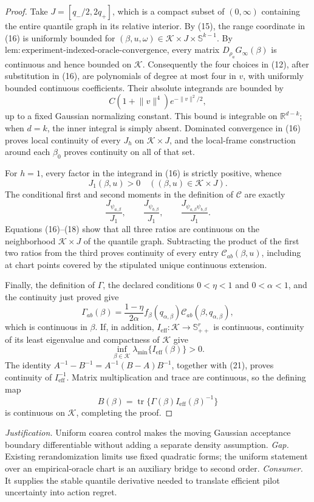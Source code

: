 \documentclass{article}
\begin{document}
\begin{proof}
Take
\(J=[q_-/2,2q_+]\), which is a compact subset of \((0,\infty)\) containing the entire quantile graph in its relative interior.  By (15), the range coordinate in (16) is uniformly bounded for \((\beta,u,\omega)\in\mathcal K\times J\times\mathbb S^{k-1}\).  By \(\mathrm{lem{:}experiment\text{-}indexed\text{-}oracle\text{-}convergence}\), every matrix \(D_{\rho_a}G_\infty(\beta)\) is continuous and hence bounded on \(\mathcal K\).  Consequently the four choices in (12), after substitution in (16), are polynomials of degree at most four in \(v\), with uniformly bounded continuous coefficients.  Their absolute integrands are bounded by
\[
C(1+\lVert v\rVert^4)e^{-\lVert v\rVert^2/2},
\tag{17}
\]
up to a fixed Gaussian normalizing constant.  This bound is integrable on \(\mathbb R^{d-k}\); when \(d=k\), the inner integral is simply absent.  Dominated convergence in (16) proves local continuity of every \(J_h\) on \(\mathcal K\times J\), and the local-frame construction around each \(\beta_0\) proves continuity on all of that set.

For \(h=1\), every factor in the integrand in (16) is strictly positive, whence
\[
J_1(\beta,u)>0
\quad((\beta,u)\in\mathcal K\times J).
\tag{18}
\]
The conditional first and second moments in the definition of \(\mathcal C\) are exactly
\[
\frac{J_{\psi_{a,\beta}}}{J_1},\qquad
\frac{J_{\psi_{b,\beta}}}{J_1},\qquad
\frac{J_{\psi_{a,\beta}\psi_{b,\beta}}}{J_1}.
\tag{19}
\]
Equations (16)--(18) show that all three ratios are continuous on the neighborhood \(\mathcal K\times J\) of the quantile graph.  Subtracting the product of the first two ratios from the third proves continuity of every entry \(\mathcal C_{ab}(\beta,u)\), including at chart points covered by the stipulated unique continuous extension.

Finally, the definition of \(\Gamma\), the declared conditions \(0<\eta<1\) and \(0<\alpha<1\), and the continuity just proved give
\[
\Gamma_{ab}(\beta)
=\frac{1-\eta}{2\alpha}
f_\beta(q_{\alpha,\beta})
\mathcal C_{ab}(\beta,q_{\alpha,\beta}),
\tag{20}
\]
which is continuous in \(\beta\).  If, in addition, \(I_{\mathrm{eff}}:\mathcal K\to\mathbb S_{++}^{r}\) is continuous, continuity of its least eigenvalue and compactness of \(\mathcal K\) give
\[
\inf_{\beta\in\mathcal K}\lambda_{\min}\{I_{\mathrm{eff}}(\beta)\}>0.
\tag{21}
\]
The identity \(A^{-1}-B^{-1}=A^{-1}(B-A)B^{-1}\), together with (21), proves continuity of \(I_{\mathrm{eff}}^{-1}\).  Matrix multiplication and trace are continuous, so the defining map
\[
B(\beta)=\operatorname{tr}\{\Gamma(\beta)I_{\mathrm{eff}}(\beta)^{-1}\}
\tag{22}
\]
is continuous on \(\mathcal K\), completing the proof.
\end{proof}
\par\smallskip\noindent \textit{Justification.} Uniform coarea control makes the moving Gaussian acceptance boundary differentiable without adding a separate density assumption. \textit{Gap.} Existing rerandomization limits use fixed quadratic forms; the uniform statement over an empirical-oracle chart is an auxiliary bridge to second order. \textit{Consumer.} It supplies the stable quantile derivative needed to translate efficient pilot uncertainty into action regret.
\end{document}
